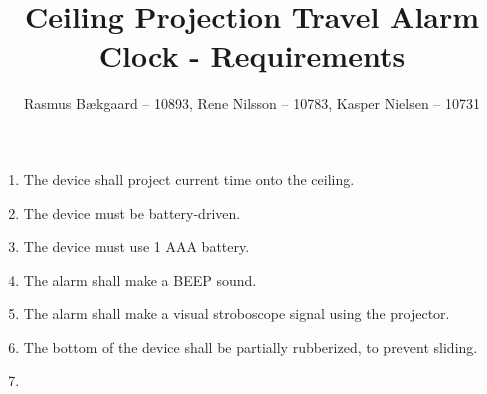 \documentclass[10pt]{article}
\title{Ceiling Projection Travel Alarm Clock - Requirements}
\author{Rasmus Bækgaard -- 10893, Rene Nilsson -- 10783, Kasper Nielsen -- 10731}
\begin{document}
\maketitle

\begin{enumerate}
	\item 
	The device shall project current time onto the ceiling.
	
	\item 
	The device must be battery-driven.

	\item
	The device must use 1 AAA battery.

	\item
	The alarm shall make a BEEP sound.

	\item 
	The alarm shall make a visual stroboscope signal using the projector.

	\item
	The bottom of the device shall be partially rubberized, to prevent sliding.

	\item
	



\end{enumerate}
\end{document}
